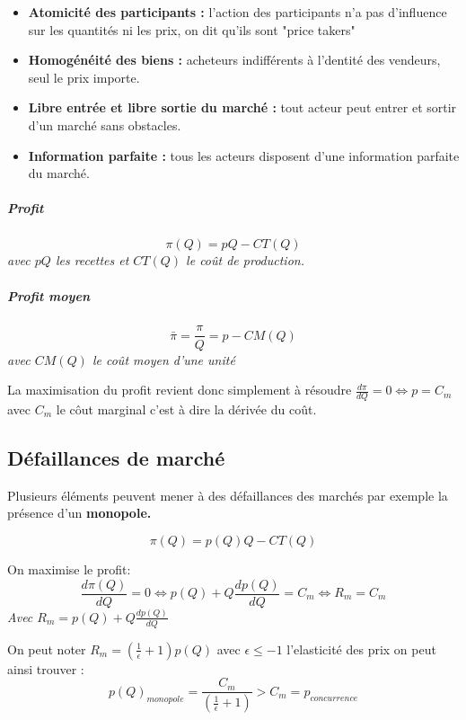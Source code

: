 \begin{itemize}[label =]
	\item \textbf{Atomicité des participants : }l'action des participants n'a pas d'influence sur les quantités ni les prix, on dit qu'ils sont "price takers"
	\item \textbf{Homogénéité des biens :} acheteurs indifférents à l'dentité des vendeurs, seul le prix importe.
	\item \textbf{Libre entrée et libre sortie du marché :} tout acteur peut entrer et sortir d'un marché sans obstacles.
	\item \textbf{Information parfaite :} tous les acteurs disposent d'une information parfaite du marché.
\end{itemize}
\begin{tcolorbox}[title=Concurrence pure et parfaite]

\subparagraph{Profit} %
\label{subp:profit}

\[
	\pi(Q)= pQ-CT(Q)
\]
\emph{avec $pQ$ les recettes et $CT(Q)$ le coût de production.}

\subparagraph{Profit moyen} %
\label{subp:profit_moyen}
\[
	\bar{\pi}= \frac{\pi}{Q}= p - CM(Q)
\]
\emph{avec $CM(Q)$ le coût moyen d'une unité }



La maximisation du profit revient donc simplement à résoudre $\frac{d\pi}{dQ}=0 \Leftrightarrow p=C_m$ avec $C_m$ le côut marginal c'est à dire la dérivée du coût.
\end{tcolorbox}


\subsection{Défaillances de marché} %
\label{sub:defaillances_de_marche}
Plusieurs éléments peuvent mener à des défaillances des marchés par exemple la présence d'un \textbf{monopole.}
\begin{tcolorbox}[title=Monopole]


\[
	\pi(Q)= p(Q)Q- CT(Q)
\]

On maximise le profit: 
\[
	\frac{d\pi(Q)}{dQ}=0 \Leftrightarrow p(Q)+ Q\frac{dp(Q)}{dQ}= C_m \Leftrightarrow R_m= C_m
\]
\emph{Avec $R_m=p(Q)+ Q\frac{dp(Q)}{dQ}$}

On peut noter $R_m= \left(\frac{1}{\epsilon}+1 \right)p(Q)$ avec $\epsilon \leq -1$ l'elasticité des prix on peut ainsi trouver : 
\[
	p(Q)_{monopole}=\frac{C_m}{\left(\frac{1}{\epsilon}+1 \right)} > C_m=p_{concurrence}
\]
\end{tcolorbox}


